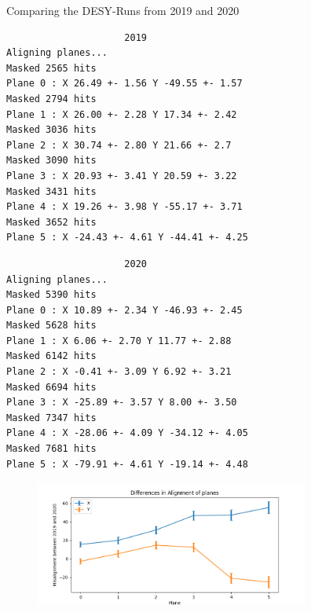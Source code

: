 \documentclass{beamer}
\begin{document}
\begin{frame}[fragile]{Comparing the DESY-Runs from 2019 and 2020}
    \begin{minipage}{.49\textwidth}
	\begin{lstlisting}
                     2019
Aligning planes...
Masked 2565 hits
Plane 0 : X 26.49 +- 1.56 Y -49.55 +- 1.57
Masked 2794 hits
Plane 1 : X 26.00 +- 2.28 Y 17.34 +- 2.42
Masked 3036 hits
Plane 2 : X 30.74 +- 2.80 Y 21.66 +- 2.7
Masked 3090 hits
Plane 3 : X 20.93 +- 3.41 Y 20.59 +- 3.22
Masked 3431 hits
Plane 4 : X 19.26 +- 3.98 Y -55.17 +- 3.71
Masked 3652 hits
Plane 5 : X -24.43 +- 4.61 Y -44.41 +- 4.25
\end{lstlisting}
    \end{minipage}
    \begin{minipage}{.49\textwidth}
	\begin{lstlisting}
                     2020
Aligning planes...
Masked 5390 hits
Plane 0 : X 10.89 +- 2.34 Y -46.93 +- 2.45
Masked 5628 hits
Plane 1 : X 6.06 +- 2.70 Y 11.77 +- 2.88
Masked 6142 hits
Plane 2 : X -0.41 +- 3.09 Y 6.92 +- 3.21
Masked 6694 hits
Plane 3 : X -25.89 +- 3.57 Y 8.00 +- 3.50
Masked 7347 hits
Plane 4 : X -28.06 +- 4.09 Y -34.12 +- 4.05
Masked 7681 hits
Plane 5 : X -79.91 +- 4.61 Y -19.14 +- 4.48
\end{lstlisting}
    \end{minipage}
    \pause
    \begin{figure}[H]
	\centering
	\includegraphics[trim=0 0 0 18,clip,width=9cm]{Misalignment.png}
    \end{figure}
\end{frame}
\end{document}
